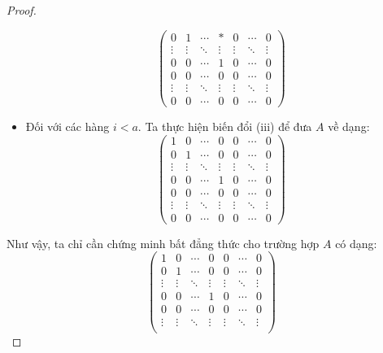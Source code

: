 \documentclass[class=linear-algebra,crop=false]{standalone}
\begin{document}
\begin{proof}
\begin{itemize}
\[\begin{pmatrix}
				      0      & 1      & \cdots & *      & 0      & \cdots & 0      \\
				      \vdots & \vdots & \ddots & \vdots & \vdots & \ddots & \vdots \\
				      0      & 0      & \cdots & 1      & 0      & \cdots & 0      \\
				      0      & 0      & \cdots & 0      & 0      & \cdots & 0      \\
				      \vdots & \vdots & \ddots & \vdots & \vdots & \ddots & \vdots \\
				      0      & 0      & \cdots & 0      & 0      & \cdots & 0
			      \end{pmatrix}
		      \]
		\item Đối với các hàng $i < a$. Ta thực hiện biến đổi (iii) để đưa $A$ về dạng:
		      \[
			      \begin{pmatrix}
				      1      & 0      & \cdots & 0      & 0      & \cdots & 0      \\
				      0      & 1      & \cdots & 0      & 0      & \cdots & 0      \\
				      \vdots & \vdots & \ddots & \vdots & \vdots & \ddots & \vdots \\
				      0      & 0      & \cdots & 1      & 0      & \cdots & 0      \\
				      0      & 0      & \cdots & 0      & 0      & \cdots & 0      \\
				      \vdots & \vdots & \ddots & \vdots & \vdots & \ddots & \vdots \\
				      0      & 0      & \cdots & 0      & 0      & \cdots & 0
			      \end{pmatrix}
		      \]
	\end{itemize}
	\par Như vậy, ta chỉ cần chứng minh bất đẳng thức cho trường hợp $A$ có dạng:
	\[
		\begin{pmatrix}
			1      & 0      & \cdots & 0      & 0      & \cdots & 0      \\
			0      & 1      & \cdots & 0      & 0      & \cdots & 0      \\
			\vdots & \vdots & \ddots & \vdots & \vdots & \ddots & \vdots \\
			0      & 0      & \cdots & 1      & 0      & \cdots & 0      \\
			0      & 0      & \cdots & 0      & 0      & \cdots & 0      \\
			\vdots & \vdots & \ddots & \vdots & \vdots & \ddots & \vdots \\

\end{pmatrix}\]
\end{proof}
\end{document}
